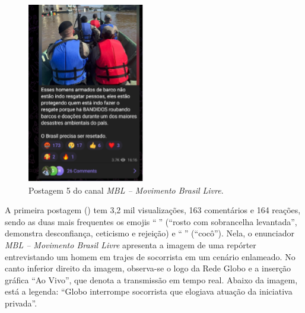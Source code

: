 \documentclass[portuguese]{textolivre}
\begin{document}
\begin{figure}[h!]
\begin{minipage}[t]{0.34\textwidth}
        \includegraphics[width=\linewidth]{Imagens/Fig22.png}
        \caption{Postagem 5 do canal \emph{MBL -- Movimento Brasil Livre}.}
        \label{fig-22}
    \end{minipage}
\end{figure}

A primeira postagem () tem 3,2 mil visualizações, 163 comentários e 164 reações, sendo as duas mais frequentes os emojis ``{\Symbola 🤨}'' (``rosto com sobrancelha levantada'', demonstra desconfiança, ceticismo e rejeição) e ``{\Symbola 💩}'' (``cocô''). Nela, o enunciador \emph{MBL -- Movimento Brasil Livre} apresenta a imagem de uma repórter entrevistando um homem em trajes de socorrista em um cenário enlameado. No canto inferior direito da imagem, observa-se o logo da Rede Globo e a inserção gráfica ``Ao Vivo'', que denota a transmissão em tempo real. Abaixo da imagem, está a legenda: ``Globo interrompe socorrista que elogiava atuação da iniciativa privada''.
\end{document}
